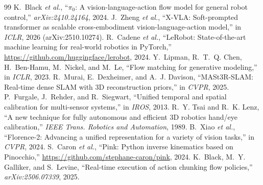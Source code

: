 \documentclass[conference,10pt]{IEEEtran}
\begin{document}
\begin{thebibliography}{99}
 K.~Black \emph{et al.}, ``$\pi_0$: A vision-language-action flow model for general robot control,'' \emph{arXiv:2410.24164}, 2024.
 J.~Zheng \emph{et al.}, ``X-VLA: Soft-prompted transformer as scalable cross-embodiment vision-language-action model,'' in \emph{ICLR}, 2026 (arXiv:2510.10274).
 R.~Cadene \emph{et al.}, ``LeRobot: State-of-the-art machine learning for real-world robotics in PyTorch,'' \url{https://github.com/huggingface/lerobot}, 2024.
 Y.~Lipman, R.~T.~Q. Chen, H.~Ben-Hamu, M.~Nickel, and M.~Le, ``Flow matching for generative modeling,'' in \emph{ICLR}, 2023.
 R.~Murai, E.~Dexheimer, and A.~J. Davison, ``MASt3R-SLAM: Real-time dense SLAM with 3D reconstruction priors,'' in \emph{CVPR}, 2025.
 P.~Furgale, J.~Rehder, and R.~Siegwart, ``Unified temporal and spatial calibration for multi-sensor systems,'' in \emph{IROS}, 2013.
 R.~Y. Tsai and R.~K. Lenz, ``A new technique for fully autonomous and efficient 3D robotics hand/eye calibration,'' \emph{IEEE Trans. Robotics and Automation}, 1989.
 B.~Xiao \emph{et al.}, ``Florence-2: Advancing a unified representation for a variety of vision tasks,'' in \emph{CVPR}, 2024.
 S.~Caron \emph{et al.}, ``Pink: Python inverse kinematics based on Pinocchio,'' \url{https://github.com/stephane-caron/pink}, 2024.
 K.~Black, M.~Y. Galliker, and S.~Levine, ``Real-time execution of action chunking flow policies,'' \emph{arXiv:2506.07339}, 2025.
\end{thebibliography}
\end{document}
